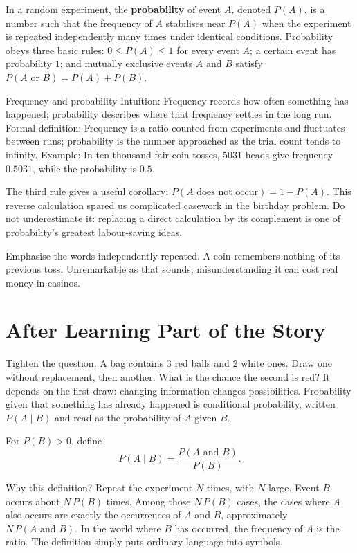 \begin{dingyi}
In a random experiment, the \textbf{probability} of event $A$, denoted $P(A)$, is a number such that the frequency of $A$ stabilises near $P(A)$ when the experiment is repeated independently many times under identical conditions. Probability obeys three basic rules: $0\le P(A)\le 1$ for every event $A$; a certain event has probability $1$; and mutually exclusive events $A$ and $B$ satisfy $P(A\text{ or }B)=P(A)+P(B)$.
\end{dingyi}

\begin{shuyu}{Frequency and probability}
Intuition: Frequency records how often something has happened; probability describes where that frequency settles in the long run. Formal definition: Frequency is a ratio counted from experiments and fluctuates between runs; probability is the number approached as the trial count tends to infinity. Example: In ten thousand fair-coin tosses, $5031$ heads give frequency $0.5031$, while the probability is $0.5$.
\end{shuyu}

The third rule gives a useful corollary: $P(A\text{ does not occur})=1-P(A)$. This reverse calculation spared us complicated casework in the birthday problem. Do not underestimate it: replacing a direct calculation by its complement is one of probability's greatest labour-saving ideas.

Emphasise the words independently repeated. A coin remembers nothing of its previous toss. Unremarkable as that sounds, misunderstanding it can cost real money in casinos.

\section{After Learning Part of the Story}

Tighten the question. A bag contains $3$ red balls and $2$ white ones. Draw one without replacement, then another. What is the chance the second is red? It depends on the first draw: changing information changes possibilities. Probability given that something has already happened is conditional probability, written $P(A\mid B)$ and read as the probability of $A$ given $B$.

\begin{dingyi}
For $P(B)>0$, define
\[
P(A\mid B)=\frac{P(A\text{ and }B)}{P(B)}.
\]
\end{dingyi}

Why this definition? Repeat the experiment $N$ times, with $N$ large. Event $B$ occurs about $N\,P(B)$ times. Among those $N\,P(B)$ cases, the cases where $A$ also occurs are exactly the occurrences of $A$ and $B$, approximately $N\,P(A\text{ and }B)$. In the world where $B$ has occurred, the frequency of $A$ is the ratio. The definition simply puts ordinary language into symbols.

